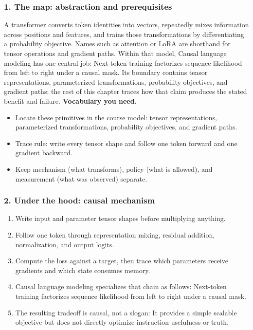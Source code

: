\subsubsection*{1. The map: abstraction and prerequisites}
A transformer converts token identities into vectors, repeatedly mixes information across positions and features, and trains those transformations by differentiating a probability objective. Names such as attention or LoRA are shorthand for tensor operations and gradient paths.
Within that model, Causal language modeling has one central job: Next-token training factorizes sequence likelihood from left to right under a causal mask. Its boundary contains tensor representations, parameterized transformations, probability objectives, and gradient paths; the rest of this chapter traces how that claim produces the stated benefit and failure.
\textbf{Vocabulary you need.}\begin{itemize}
\item Locate these primitives in the course model: tensor representations, parameterized transformations, probability objectives, and gradient paths.
\item Trace rule: write every tensor shape and follow one token forward and one gradient backward.
\item Keep mechanism (what transforms), policy (what is allowed), and measurement (what was observed) separate.
\end{itemize}
\subsubsection*{2. Under the hood: causal mechanism}\begin{enumerate}
\item Write input and parameter tensor shapes before multiplying anything.
\item Follow one token through representation mixing, residual addition, normalization, and output logits.
\item Compute the loss against a target, then trace which parameters receive gradients and which state consumes memory.
\item Causal language modeling specializes that chain as follows: Next-token training factorizes sequence likelihood from left to right under a causal mask.
\item The resulting tradeoff is causal, not a slogan: It provides a simple scalable objective but does not directly optimize instruction usefulness or truth.
\end{enumerate}
